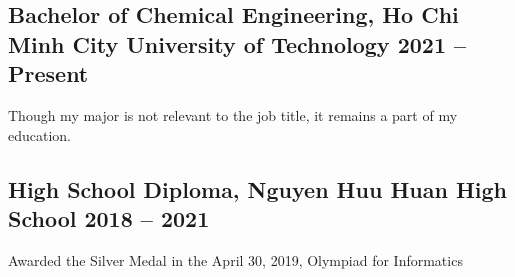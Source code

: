 \subsection{{Bachelor of Chemical Engineering, Ho Chi Minh City University of Technology \hfill 2021 -- Present }}

\begin{zitemize}
\item Though my major is not relevant to the job title, it remains a part of my education.
\end{zitemize}


\subsection{{High School Diploma, Nguyen Huu Huan High School \hfill 2018 -- 2021 }}

\begin{zitemize}
\item Awarded the Silver Medal in the April 30, 2019, Olympiad for Informatics
\end{zitemize}